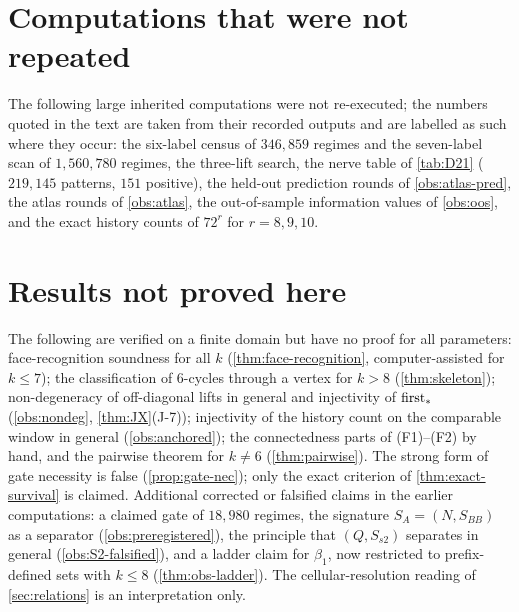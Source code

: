 \section{Computations that were not repeated}
The following large inherited computations were not re-executed; the numbers quoted in the text are taken from their recorded outputs and are labelled as such where they occur: the six-label census of $346{,}859$ regimes and the seven-label scan of $1{,}560{,}780$ regimes, the three-lift search, the nerve table of \cref{tab:D21} ($219{,}145$ patterns, $151$ positive), the held-out prediction rounds of \cref{obs:atlas-pred}, the atlas rounds of \cref{obs:atlas}, the out-of-sample information values of \cref{obs:oos}, and the exact history counts of $72^r$ for $r=8,9,10$.

\section{Results not proved here}
The following are verified on a finite domain but have no proof for all parameters: face-recognition soundness for all $k$ (\cref{thm:face-recognition}, computer-assisted for $k\le7$); the classification of $6$-cycles through a vertex for $k>8$ (\cref{thm:skeleton}); non-degeneracy of off-diagonal lifts in general and injectivity of $\mathrm{first}_\ast$ (\cref{obs:nondeg}, \cref{thm:JX}(J-7)); injectivity of the history count on the comparable window in general (\cref{obs:anchored}); the connectedness parts of (F1)--(F2) by hand, and the pairwise theorem for $k\ne6$ (\cref{thm:pairwise}). The strong form of gate necessity is false (\cref{prop:gate-nec}); only the exact criterion of \cref{thm:exact-survival} is claimed. Additional corrected or falsified claims in the earlier computations: a claimed gate of $18{,}980$ regimes, the signature $S_A=(N,S_{BB})$ as a separator (\cref{obs:preregistered}), the principle that $(Q,S_{s2})$ separates in general (\cref{obs:S2-falsified}), and a ladder claim for $\beta_1$, now restricted to prefix-defined sets with $k\le8$ (\cref{thm:obs-ladder}). The cellular-resolution reading of \cref{sec:relations} is an interpretation only.

